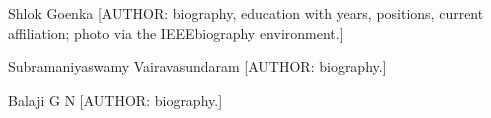 \begin{IEEEbiographynophoto}{Shlok Goenka}
[AUTHOR: biography, education with years, positions, current affiliation; photo via the IEEEbiography environment.]
\end{IEEEbiographynophoto}
\begin{IEEEbiographynophoto}{Subramaniyaswamy Vairavasundaram}
[AUTHOR: biography.]
\end{IEEEbiographynophoto}
\begin{IEEEbiographynophoto}{Balaji G N}
[AUTHOR: biography.]
\end{IEEEbiographynophoto}
